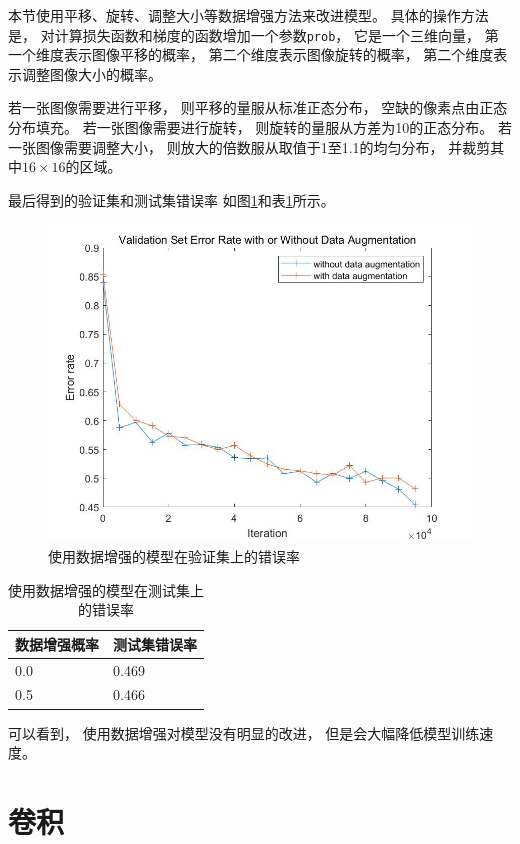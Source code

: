 \documentclass{article}
\begin{document}
本节使用平移、旋转、调整大小等数据增强方法来改进模型。
具体的操作方法是，
对计算损失函数和梯度的函数增加一个参数\verb|prob|，
它是一个三维向量，
第一个维度表示图像平移的概率，
第二个维度表示图像旋转的概率，
第二个维度表示调整图像大小的概率。

若一张图像需要进行平移，
则平移的量服从标准正态分布，
空缺的像素点由正态分布填充。
若一张图像需要进行旋转，
则旋转的量服从方差为10的正态分布。
若一张图像需要调整大小，
则放大的倍数服从取值于1至1.1的均匀分布，
并裁剪其中$ 16 \times 16 $的区域。

最后得到的验证集和测试集错误率
如图\ref{fig:9}和表\ref{table:9}所示。

\begin{figure}[p]
\includegraphics[width=\textwidth]{9.jpg}
\caption{使用数据增强的模型在验证集上的错误率}
\label{fig:9}
\end{figure}

\begin{table}[h]
\centering
\begin{tabular}{|l|l|} 
\hline
数据增强概率 & 测试集错误率 \\
\hline
0.0 & 0.469 \\
0.5 & 0.466 \\
\hline
\end{tabular}
\caption{使用数据增强的模型在测试集上的错误率}
\label{table:9}
\end{table}

可以看到，
使用数据增强对模型没有明显的改进，
但是会大幅降低模型训练速度。

\section{卷积}
\end{document}
